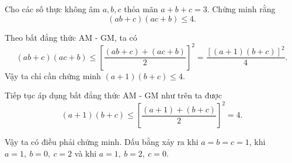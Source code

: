 \begin{problem}
    Cho các số thực không âm $a, b, c$ thỏa mãn $a + b + c = 3$. Chứng minh rằng
    $$
        (ab + c)(ac + b) \le 4.
    $$
    \solution
    
    Theo bất đẳng thức AM - GM, ta có
    $$
        (ab + c)(ac + b) \le \left[\frac{(ab + c) + (ac + b)}{2}\right]^2 = \frac{[(a + 1)(b + c)]^2}{4}.
    $$
    Vậy ta chỉ cần chứng minh $(a + 1)(b + c) \le 4$.
    
    Tiếp tục áp dụng bất đẳng thức AM - GM như trên ta được
    $$
        (a + 1)(b + c) \le \left[\frac{(a + 1) + (b + c)}{2}\right]^2 = 4. 
    $$
    
    Vậy ta có điều phải chứng minh. Dấu bằng xảy ra khi $a = b = c = 1$, khi $a = 1,\ b = 0,\ c = 2$ và khi $a = 1,\ b = 2,\ c = 0$.
\end{problem}
